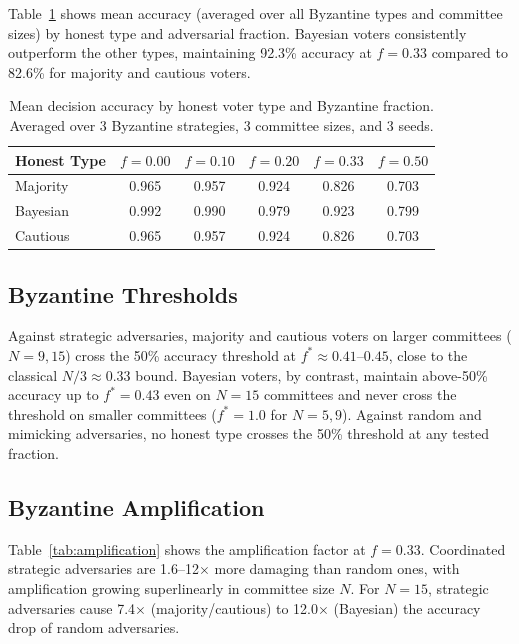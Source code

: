 \documentclass[11pt]{article}
\begin{document}
Table~\ref{tab:accuracy} shows mean accuracy (averaged over all Byzantine types and committee sizes) by honest type and adversarial fraction.
Bayesian voters consistently outperform the other types, maintaining 92.3\% accuracy at $f = 0.33$ compared to 82.6\% for majority and cautious voters.

\begin{table}[h]
\centering
\caption{Mean decision accuracy by honest voter type and Byzantine fraction. Averaged over 3 Byzantine strategies, 3 committee sizes, and 3 seeds.}
\label{tab:accuracy}
\begin{tabular}{lccccc}
\toprule
Honest Type & $f=0.00$ & $f=0.10$ & $f=0.20$ & $f=0.33$ & $f=0.50$ \\
\midrule
Majority  & 0.965 & 0.957 & 0.924 & 0.826 & 0.703 \\
Bayesian  & 0.992 & 0.990 & 0.979 & 0.923 & 0.799 \\
Cautious  & 0.965 & 0.957 & 0.924 & 0.826 & 0.703 \\
\bottomrule
\end{tabular}
\end{table}

\subsection{Byzantine Thresholds}

Against strategic adversaries, majority and cautious voters on larger committees ($N = 9, 15$) cross the 50\% accuracy threshold at $f^* \approx 0.41$--$0.45$, close to the classical $N/3 \approx 0.33$ bound.
Bayesian voters, by contrast, maintain above-50\% accuracy up to $f^* = 0.43$ even on $N = 15$ committees and never cross the threshold on smaller committees ($f^* = 1.0$ for $N = 5, 9$).
Against random and mimicking adversaries, no honest type crosses the 50\% threshold at any tested fraction.

\subsection{Byzantine Amplification}

Table~\ref{tab:amplification} shows the amplification factor at $f = 0.33$.
Coordinated strategic adversaries are 1.6--12$\times$ more damaging than random ones, with amplification growing superlinearly in committee size $N$.
For $N = 15$, strategic adversaries cause 7.4$\times$ (majority/cautious) to 12.0$\times$ (Bayesian) the accuracy drop of random adversaries.
\end{document}
